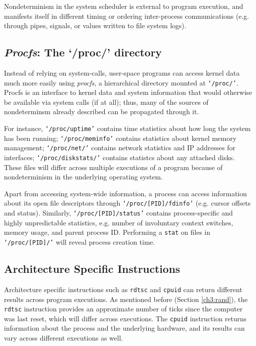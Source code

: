 Nondeterminism in the system
scheduler is external to 
program execution, and manifests itself
in different timing or ordering
inter-process communications (e.g.
through pipes, signals, or 
values written to file system logs).

\subsection{{\em Procfs}: The `/proc/' directory}\label{ch3:procfs}
Instead of relying on system-calls, user-space programs
can access kernel data much more easily using {\em procfs}, a hierarchical 
directory mounted at \texttt{`/proc/'}.
Procfs is an interface
to kernel data and system information
that would otherwise be available
via system calls (if at all);
thus, many of the sources of nondeterminsm
already described can be propagated
through it.

For instance, \texttt{`/proc/uptime'} contains time statistics about how
long the system has been running;
\texttt{`/proc/meminfo'} contains statistics about kernel memory management;
\texttt{`/proc/net/'} contains network statistics and IP addresses for interfaces;
\texttt{`/proc/diskstats/'} contains statistcs about any attached disks.
These files will differ across multiple executions
of a program because of nondeterminism in the underlying operating system. 

Apart from accessing system-wide information, a process can access 
information about its open file descriptors through
\texttt{`/proc/[PID]/fdinfo'} (e.g. cursor offsets and status).
Similarly, \texttt{`/proc/[PID]/status'} contains
process-specific and highly unpredictable statistics,
e.g. number of involuntary context switches,
memory usage, and parent process ID.
Performing a \texttt{stat} on files in \texttt{`/proc/[PID]/'}
will reveal process creation time.

\subsection{Architecture Specific Instructions}
Architecture specific instructions such as \texttt{rdtsc}
and \texttt{cpuid} can return different
results across program executions. As mentioned before
(Section \ref{ch3:rand}), the \texttt{rdtsc} instruction provides an approximate number of ticks since
the computer was last reset, which
will differ across executions. The \texttt{cpuid} instruction
returns information about the process and the underlying 
hardware, and its results can vary across different
executions as well.

